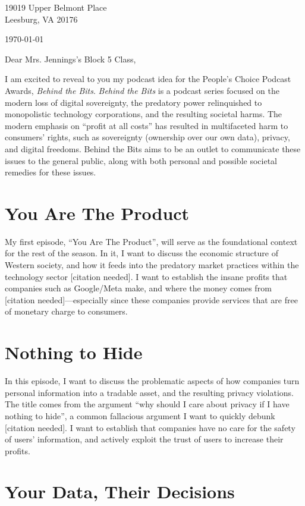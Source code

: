 \documentclass[12pt]{article}
\begin{document}
\begin{flushright}
  19019 Upper Belmont Place \\ Leesburg, VA 20176
  
  \medskip \today
\end{flushright}

\medskip
Dear Mrs. Jennings’s Block 5 Class,

\medskip
I am excited to reveal to you my podcast idea for the People’s Choice Podcast
Awards, \emph{Behind the Bits}. \emph{Behind the Bits} is a podcast series focused on the
modern loss of digital sovereignty, the predatory power relinquished to
monopolistic technology corporations, and the resulting societal harms. The
modern emphasis on “profit at all costs” has resulted in multifaceted harm to
consumers’ rights, such as sovereignty (ownership over our own data), privacy,
and digital freedoms. Behind the Bits aims to be an outlet to communicate these
issues to the general public, along with both personal and possible societal
remedies for these issues.

\section{You Are The Product}
My first episode, “You Are The Product”, will serve as the foundational context for the rest of the season. In it, I want to discuss the economic structure of Western society, and how it feeds into the predatory market practices within the technology sector [citation needed]. I want to establish the insane profits that companies such as Google/Meta make, and where the money comes from [citation needed]—especially since these companies provide services that are free of monetary charge to consumers.

\section{Nothing to Hide}
In this episode, I want to discuss the problematic aspects of how companies turn personal information into a tradable asset, and the resulting privacy violations. The title comes from the argument “why should I care about privacy if I have nothing to hide”, a common fallacious argument I want to quickly debunk [citation needed]. I want to establish that companies have no care for the safety of users’ information, and actively exploit the trust of users to increase their profits.

\section{Your Data, Their Decisions}
\end{document}
